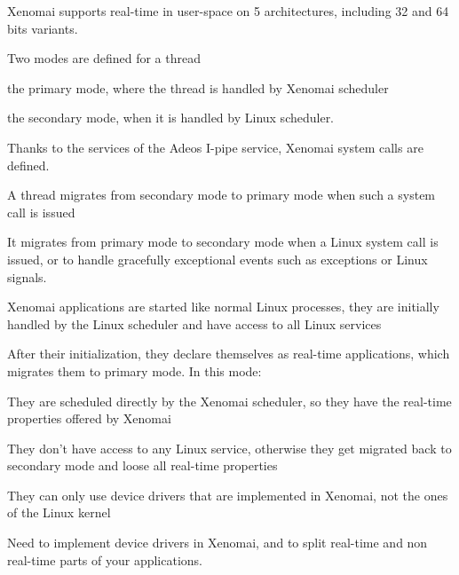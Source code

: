   \startitemize
  \item Xenomai supports real-time in user-space on 5 architectures,
    including 32 and 64 bits variants.
  \item Two modes are defined for a thread
    \startitemize
    \item the primary mode, where the thread is handled by Xenomai
      scheduler
    \item the secondary mode, when it is handled by Linux scheduler.
    \stopitemize
  \item Thanks to the services of the Adeos I-pipe service, Xenomai
    system calls are defined.
    \startitemize
    \item A thread migrates from secondary mode to primary mode when
      such a system call is issued
    \item It migrates from primary mode to secondary mode when a Linux
      system call is issued, or to handle gracefully exceptional
      events such as exceptions or Linux signals.
    \stopitemize
  \stopitemize

  \startitemize
  \item Xenomai applications are started like normal Linux processes,
    they are initially handled by the Linux scheduler and have access
    to all Linux services
  \item After their initialization, they declare themselves as
    real-time applications, which migrates them to primary mode. In
    this mode:
    \startitemize
    \item They are scheduled directly by the Xenomai scheduler, so
      they have the real-time properties offered by Xenomai
    \item They don't have access to any Linux service, otherwise they
      get migrated back to secondary mode and loose all real-time
      properties
    \item They can only use device drivers that are implemented in
      Xenomai, not the ones of the Linux kernel
    \stopitemize
  \item Need to implement device drivers in Xenomai, and to split
    real-time and non real-time parts of your applications.
  \stopitemize

